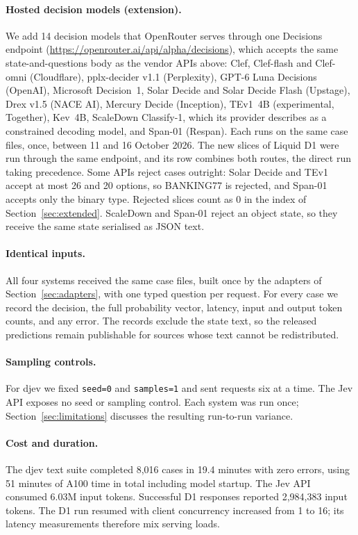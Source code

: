 \paragraph{Hosted decision models (extension).} We add 14 decision models
that OpenRouter serves through one Decisions endpoint
(\url{https://openrouter.ai/api/alpha/decisions}), which accepts the same
state-and-questions body as the vendor APIs above:
Clef, Clef-flash and Clef-omni (Cloudflare), pplx-decider v1.1 (Perplexity),
GPT-6 Luna Decisions (OpenAI), Microsoft Decision~1, Solar Decide and Solar
Decide Flash (Upstage), Drex v1.5 (NACE AI), Mercury Decide (Inception), TEv1~4B
(experimental, Together), Kev~4B, ScaleDown Classify-1, which its provider
describes as a constrained decoding model, and Span-01 (Respan). Each runs
on the same case files, once, between 11 and 16 October 2026. The new slices
of Liquid D1 were run through the same endpoint, and its row combines both
routes, the direct run taking precedence. Some APIs reject cases outright:
Solar Decide and TEv1 accept at most 26 and 20 options, so BANKING77 is
rejected, and Span-01 accepts only the binary type. Rejected slices count as 0
in the index of Section~\ref{sec:extended}. ScaleDown and Span-01 reject an
object state, so they receive the same state serialised as JSON text.

\paragraph{Identical inputs.} All four systems received the same case files,
built once by the adapters of Section~\ref{sec:adapters}, with one typed question
per request. For every case we record the decision, the full probability vector,
latency, input and output token counts, and any error. The records exclude the
state text, so the released predictions remain publishable for sources whose
text cannot be redistributed.

\paragraph{Sampling controls.} For djev we fixed \texttt{seed=0} and
\texttt{samples=1} and sent requests six at a time. The Jev API exposes no seed
or sampling control. Each system was run once; Section~\ref{sec:limitations}
discusses the resulting run-to-run variance.

\paragraph{Cost and duration.} The djev text suite completed 8{,}016 cases in
19.4 minutes with zero errors, using 51 minutes of A100 time in total including
model startup. The Jev API consumed 6.03M input tokens. Successful D1 responses
reported 2{,}984{,}383 input tokens. The D1 run resumed with client concurrency
increased from 1 to 16; its latency measurements therefore mix serving loads.
